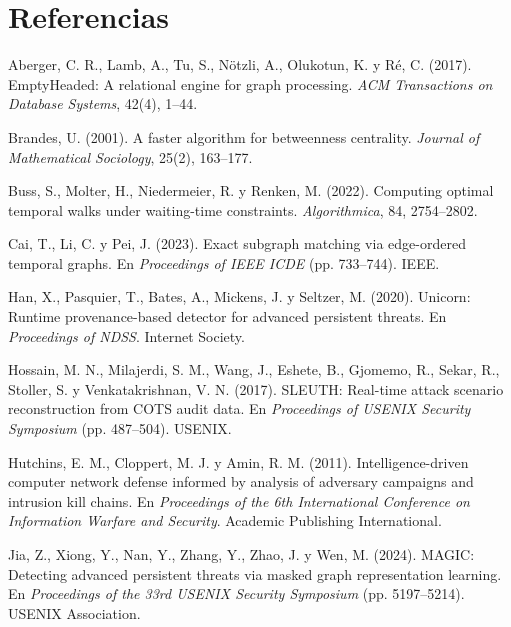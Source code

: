 \documentclass[11pt,a4paper]{article}
\begin{document}
\section*{Referencias}
\small
\begin{list}{}{\setlength{\leftmargin}{1.5em}\setlength{\itemindent}{-1.5em}
\setlength{\itemsep}{2pt}}

\item Aberger, C. R., Lamb, A., Tu, S., Nötzli, A., Olukotun, K. y Ré, C.
(2017). EmptyHeaded: A relational engine for graph processing. \emph{ACM
Transactions on Database Systems}, 42(4), 1--44.

\item Brandes, U. (2001). A faster algorithm for betweenness centrality.
\emph{Journal of Mathematical Sociology}, 25(2), 163--177.

\item Buss, S., Molter, H., Niedermeier, R. y Renken, M. (2022). Computing
optimal temporal walks under waiting-time constraints. \emph{Algorithmica}, 84,
2754--2802.

\item Cai, T., Li, C. y Pei, J. (2023). Exact subgraph matching via
edge-ordered temporal graphs. En \emph{Proceedings of IEEE ICDE} (pp.
733--744). IEEE.

\item Han, X., Pasquier, T., Bates, A., Mickens, J. y Seltzer, M. (2020).
Unicorn: Runtime provenance-based detector for advanced persistent threats. En
\emph{Proceedings of NDSS}. Internet Society.

\item Hossain, M. N., Milajerdi, S. M., Wang, J., Eshete, B., Gjomemo, R.,
Sekar, R., Stoller, S. y Venkatakrishnan, V. N. (2017). SLEUTH: Real-time
attack scenario reconstruction from COTS audit data. En \emph{Proceedings of
USENIX Security Symposium} (pp. 487--504). USENIX.

\item Hutchins, E. M., Cloppert, M. J. y Amin, R. M. (2011).
Intelligence-driven computer network defense informed by analysis of adversary
campaigns and intrusion kill chains. En \emph{Proceedings of the 6th
International Conference on Information Warfare and Security}. Academic
Publishing International.

\item Jia, Z., Xiong, Y., Nan, Y., Zhang, Y., Zhao, J. y Wen, M. (2024). MAGIC:
Detecting advanced persistent threats via masked graph representation learning.
En \emph{Proceedings of the 33rd USENIX Security Symposium} (pp. 5197--5214).
USENIX Association.


\end{list}
\end{document}
